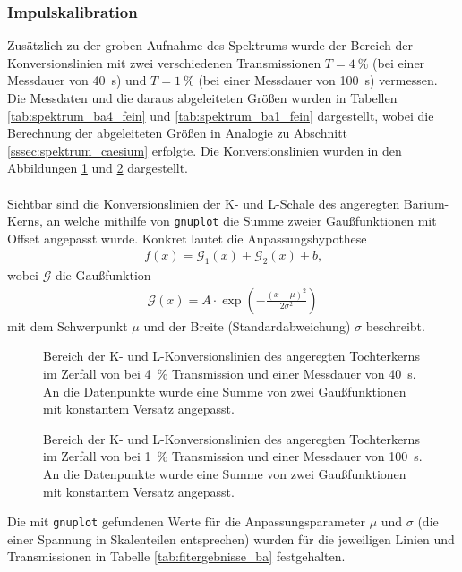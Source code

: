 \documentclass[11pt, a4paper]{article}
\numberwithin{equation}{section}
\begin{document}
\subsubsection{Impulskalibration}
\label{sssec:konversionslinien}
Zusätzlich zu der groben Aufnahme des Spektrums wurde der Bereich der Konversionslinien mit zwei verschiedenen Transmissionen $T = \SI{4}{\percent}$ (bei einer Messdauer von \SI{40}{\second}) und $T = \SI{1}{\percent}$ (bei einer Messdauer von \SI{100}{\second}) vermessen.
Die Messdaten und die daraus abgeleiteten Größen wurden in Tabellen \ref{tab:spektrum_ba4_fein} und \ref{tab:spektrum_ba1_fein} dargestellt, wobei die Berechnung der abgeleiteten Größen in Analogie zu Abschnitt \ref{sssec:spektrum_caesium} erfolgte.
Die Konversionslinien wurden in den Abbildungen \ref{fig:ba_t4_fein} und \ref{fig:ba_t1_fein} dargestellt.
\\
\\
Sichtbar sind die Konversionslinien der K- und L-Schale des angeregten Barium-Kerns, an welche mithilfe von \texttt{gnuplot} die Summe zweier Gaußfunktionen mit Offset angepasst wurde. Konkret lautet die Anpassungshypothese
\begin{align}
	f(x) = \mathcal{G}_1(x) + \mathcal{G}_2(x) + b \text{,}
\end{align}
wobei $\mathcal{G}$ die Gaußfunktion
\begin{align}
	\mathcal{G}(x) = A \cdot \exp\left( - \frac{(x - \mu)^2}{2 \sigma^2}\right)
\end{align}
mit dem Schwerpunkt $\mu$ und der Breite (Standardabweichung) $\sigma$ beschreibt.
\begin{figure}[H]
	\centering
	
	\caption{Bereich der K- und L-Konversionslinien des angeregten  Tochterkerns im Zerfall von  bei \SI{4}{\percent} Transmission und einer Messdauer von \SI{40}{\second}. An die Datenpunkte wurde eine Summe von zwei Gaußfunktionen mit konstantem Versatz angepasst.}
	\label{fig:ba_t4_fein}
\end{figure}
\begin{figure}[H]
	
	\caption{Bereich der K- und L-Konversionslinien des angeregten  Tochterkerns im Zerfall von  bei \SI{1}{\percent} Transmission und einer Messdauer von \SI{100}{\second}. An die Datenpunkte wurde eine Summe von zwei Gaußfunktionen mit konstantem Versatz angepasst.}
	\label{fig:ba_t1_fein}
\end{figure}
\noindent Die mit \texttt{gnuplot} gefundenen Werte für die Anpassungsparameter $\mu$ und $\sigma$ (die einer Spannung in Skalenteilen entsprechen) wurden für die jeweiligen Linien und Transmissionen in Tabelle \ref{tab:fitergebnisse_ba} festgehalten.
\end{document}
